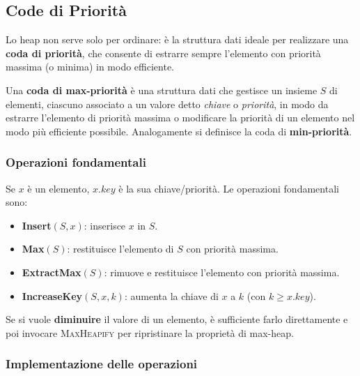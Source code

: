 \subsection{Code di Priorità}

\begin{softnote}
	Lo heap non serve solo per ordinare: è la struttura dati ideale per
	realizzare una \textbf{coda di priorità}, che consente di estrarre
	sempre l'elemento con priorità massima (o minima) in modo efficiente.
\end{softnote}

\begin{definizione}
	Una \textbf{coda di max-priorità} è una struttura dati che gestisce
	un insieme $S$ di elementi, ciascuno associato a un valore detto
	\emph{chiave} o \emph{priorità}, in modo da estrarre l'elemento di
	priorità massima o modificare la priorità di un elemento nel modo più
	efficiente possibile. Analogamente si definisce la coda di
	\textbf{min-priorità}.
\end{definizione}

\subsubsection{Operazioni fondamentali}

Se $x$ è un elemento, $x.\mathit{key}$ è la sua chiave/priorità.
Le operazioni fondamentali sono:
\begin{itemize}
	\item \textbf{Insert}$(S, x)$: inserisce $x$ in $S$.
	\item \textbf{Max}$(S)$: restituisce l'elemento di $S$ con priorità
	massima.
	\item \textbf{ExtractMax}$(S)$: rimuove e restituisce l'elemento con
	priorità massima.
	\item \textbf{IncreaseKey}$(S, x, k)$: aumenta la chiave di $x$ a
	$k$ (con $k \ge x.\mathit{key}$).
\end{itemize}

\begin{nota}
	Se si vuole \textbf{diminuire} il valore di un elemento, è sufficiente
	farlo direttamente e poi invocare \textsc{MaxHeapify} per ripristinare
	la proprietà di max-heap.
\end{nota}

\subsubsection{Implementazione delle operazioni}

